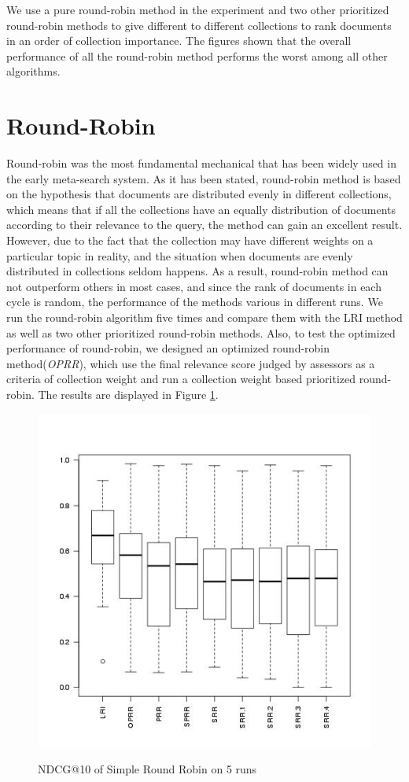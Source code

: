 We use a pure round-robin method in the experiment and two other prioritized round-robin methods to give different to different collections to rank documents in an order of collection importance. The figures shown that the overall performance of all the round-robin method performs the worst among all other algorithms.
      
\section{Round-Robin}

Round-robin was the most fundamental mechanical that has been widely used in the early meta-search system. As it has been stated, round-robin method is based on the hypothesis that documents are distributed evenly in different collections, which means that if all the collections have an equally distribution of documents according to their relevance to the query, the method can gain an excellent result. However, due to the fact that the collection may have different weights on a particular topic in reality, and the situation when documents are evenly distributed in collections seldom happens. As a result, round-robin method can not outperform others in most cases, and since the rank of documents in each cycle is random, the performance of the methods various in different runs. We run the round-robin algorithm five times and compare them with the LRI method as well as two other prioritized round-robin methods. Also, to test the optimized performance of round-robin, we designed an optimized round-robin method(\textit{OPRR}), which use the final relevance score judged by assessors as a criteria of collection weight and run a collection weight based prioritized round-robin. The results are displayed in Figure \ref{fig:rr}.
\begin{figure}
\begin{center}
\includegraphics[scale=0.6]{images/RR_NDCG}
\label{fig:rr}
\caption{NDCG@10 of Simple Round Robin on 5 runs}
\end{center}
\end{figure}
